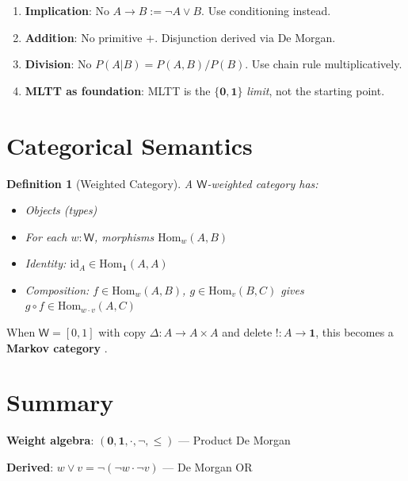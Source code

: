 \documentclass[11pt,a4paper]{article}
\newtheorem{definition}{Definition}[section]
\newcommand{\W}{\mathsf{W}}
\newcommand{\one}{\mathbf{1}}
\newcommand{\zero}{\mathbf{0}}
\newcommand{\negw}{\neg}
\begin{document}
\begin{enumerate}
    \item \textbf{Implication}: No $A \to B := \negw A \lor B$. Use conditioning instead.
    \item \textbf{Addition}: No primitive $+$. Disjunction derived via De Morgan.
    \item \textbf{Division}: No $P(A|B) = P(A,B)/P(B)$. Use chain rule multiplicatively.
    \item \textbf{MLTT as foundation}: MLTT is the $\{\zero,\one\}$ \emph{limit}, not the starting point.
\end{enumerate}

\section{Categorical Semantics}

\begin{definition}[Weighted Category]
A \emph{$\W$-weighted category} has:
\begin{itemize}
    \item Objects (types)
    \item For each $w : \W$, morphisms $\mathrm{Hom}_w(A, B)$
    \item Identity: $\mathrm{id}_A \in \mathrm{Hom}_\one(A, A)$
    \item Composition: $f \in \mathrm{Hom}_w(A, B)$, $g \in \mathrm{Hom}_v(B, C)$ gives $g \circ f \in \mathrm{Hom}_{w \cdot v}(A, C)$
\end{itemize}
\end{definition}

When $\W = {[0,1]}$ with copy $\Delta : A \to A \times A$ and delete $! : A \to \mathbf{1}$, this becomes a \textbf{Markov category} \citep{fritz2020synthetic}.

\section{Summary}

\textbf{Weight algebra}: $(\zero, \one, \cdot, \negw, \leq)$ --- Product De Morgan

\textbf{Derived}: $w \vee v = \negw(\negw w \cdot \negw v)$ --- De Morgan OR
\end{document}
